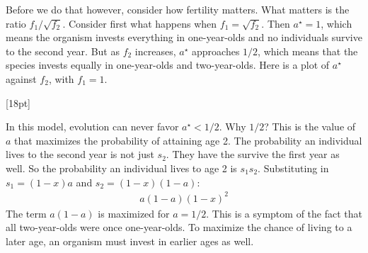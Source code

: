 \documentclass[10pt,reqno]{amsbook}
\newcommand{\margincap}[2][10pt]{\marginnote{\small\emph{#2}}[#1]}
\newcounter{myfigure}[chapter]
\newcommand{\figmarlab}[2][18pt]{%
  \refstepcounter{myfigure}%
  \label{#2}%
  \margincap[#1]{Figure\\\thechapter.\themyfigure}%
}
\numberwithin{equation}{chapter}
\begin{document}
Before we do that however, consider how fertility matters. What matters is the ratio $f_1/\!\sqrt{f_2}$. Consider first what happens when $f_1 = \sqrt{f_2}$. Then $a^{\!\star} = 1$, which means the organism invests everything in one-year-olds and no individuals survive to the second year. But as $f_2$ increases, $a^{\!\star}$ approaches $1/2$, which means that the species invests equally in one-year-olds and two-year-olds. Here is a plot of $a^{\!\star}$ against $f_2$, with $f_1=1$. 

\vspace{-6pt}
\figmarlab{figSe2}
\begin{center}
\end{center}

In this model, evolution can never favor $a^{\!\star} < 1/2$. 
Why $1/2$? This is the value of $a$ that maximizes the probability of attaining age 2. The probability an individual lives to the second year is not just $s_2$. They have the survive the first year as well. So the probability an individual lives to age 2 is $s_1 s_2$. Substituting in $s_1 = (1-x)a$ and $s_2=(1-x)(1-a)$:
\begin{align*}
	a(1-a)(1-x)^2
\end{align*}
The term $a(1-a)$ is maximized for $a=1/2$. This is a symptom of the fact that all two-year-olds were once one-year-olds. To maximize the chance of living to a later age, an organism must invest in earlier ages as well.
\end{document}
